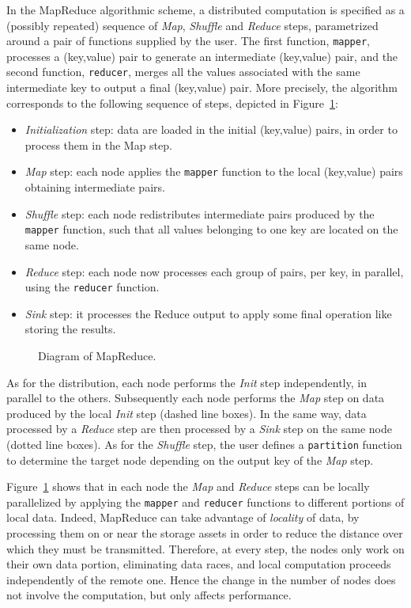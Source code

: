 \documentclass[a4paper]{article}
\numberwithin{equation}{section}
\begin{document}
In the MapReduce algorithmic scheme, a distributed computation is
specified as a (possibly repeated) sequence of \emph{Map},
\emph{Shuffle} and \emph{Reduce} steps, 
parametrized around a pair of functions supplied by the user.
The first function, \verb+mapper+, processes a (key,value)
pair to generate an intermediate (key,value) pair, and the
second function, \verb+reducer+, merges all the values associated
with the same intermediate key to output a final (key,value) pair. 
More precisely, the algorithm corresponds to the following
sequence of steps, depicted in Figure~\ref{fig:mapreduceDiagram}:
\begin{itemize}
  \item \textit{Initialization} step: data are loaded in the initial
    (key,value) pairs, in order to process them in the Map step.  
  \item \textit{Map} step: each node applies the \verb+mapper+
    function to the local (key,value) pairs obtaining intermediate
    pairs. 
  \item \textit{Shuffle} step: each node redistributes intermediate
    pairs produced by the \verb+mapper+ function, such
    that all values belonging to one key are located on the same 
    node. 
  \item \textit{Reduce} step: each node now processes each group
    of pairs, per key, in parallel, using the \verb+reducer+ function.
  \item \textit{Sink} step: it processes the Reduce output to apply
    some final operation like storing the results. 
\end{itemize}

\begin{figure}[ht]
	\centering
	\caption{Diagram of MapReduce.}
	\label{fig:mapreduceDiagram}
\end{figure}

As for the distribution, 
each node performs the \textit{Init} step independently, in parallel
to the others. Subsequently each node performs the \textit{Map} step
on data produced by the local \textit{Init} step (dashed line
boxes). 
In the same way, data processed by a \textit{Reduce} step are then
processed by a \textit{Sink} step on the same node (dotted line
boxes). 
As for the \textit{Shuffle} step, the user defines a
\verb+partition+ function to determine the target node depending on
the output key of the \textit{Map} step.

Figure~\ref{fig:mapreduceDiagram} shows that in each node
the \textit{Map} and \textit{Reduce} steps can be locally parallelized
by applying the \verb+mapper+ and \verb+reducer+ functions
to different portions of local data. 
Indeed, MapReduce can take advantage of \emph{locality} of data, by
processing them on or near the storage assets in order to reduce the
distance over which they must be transmitted. 
Therefore, at every step,
the nodes only work on their own data portion,
eliminating data races,
and local computation proceeds independently of the remote one.
Hence the change in the number of nodes does not involve the
computation, but only affects performance. 
\end{document}
